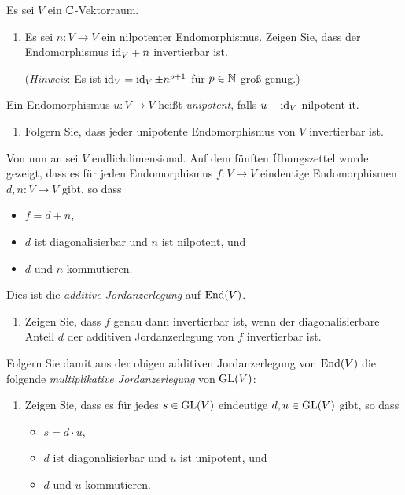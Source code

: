 \begin{question}
  Es sei $V$ ein $\mathbb{C}$-Vektorraum.
  \begin{enumerate}[leftmargin=*]
    \item
      Es sei $n \colon V \to V$ ein nilpotenter Endomorphismus.
      Zeigen Sie, dass der Endomorphismus ${\operatorname{id}_V} + n$ invertierbar ist.
      
      (\emph{Hinweis}: Es ist $\operatorname{id}_V = \operatorname{id}_V \pm n^{p+1}$ für $p \in \mathbb{N}$ groß genug.)
  \end{enumerate}
  Ein Endomorphismus $u \colon V \to V$ heißt \emph{unipotent}, falls $u - \operatorname{id}_V$ nilpotent it.
  \begin{enumerate}[leftmargin=*, resume]
    \item
      Folgern Sie, dass jeder unipotente Endomorphismus von $V$ invertierbar ist.
  \end{enumerate}
  Von nun an sei $V$ endlichdimensional.
  Auf dem fünften Übungszettel wurde gezeigt, dass es für jeden Endomorphismus $f \colon V \to V$ eindeutige Endomorphismen $d,n \colon V \to V$ gibt, so dass
  \begin{itemize}
    \item 
      $f = d + n$,
    \item
      $d$ ist diagonalisierbar und $n$ ist nilpotent, und
    \item
      $d$ und $n$ kommutieren.
  \end{itemize}
  Dies ist die \emph{additive Jordanzerlegung} auf $\operatorname{End}(V)$.
  \begin{enumerate}[leftmargin=*, resume]
    \item
      Zeigen Sie, dass $f$ genau dann invertierbar ist, wenn der diagonalisierbare Anteil $d$ der additiven Jordanzerlegung von $f$ invertierbar ist.
  \end{enumerate}
  Folgern Sie damit aus der obigen additiven Jordanzerlegung von $\operatorname{End}(V)$ die folgende \emph{multiplikative Jordanzerlegung} von $\operatorname{GL}(V)$:
  \begin{enumerate}[leftmargin=*, resume]
    \item
      Zeigen Sie, dass es für jedes $s \in \operatorname{GL}(V)$ eindeutige $d, u \in \operatorname{GL}(V)$ gibt, so dass
      \begin{itemize}
        \item
          $s = d \cdot u$,
        \item
          $d$ ist diagonalisierbar und $u$ ist unipotent, und
        \item
          $d$ und $u$ kommutieren.
      \end{itemize}
  \end{enumerate}
\end{question}


